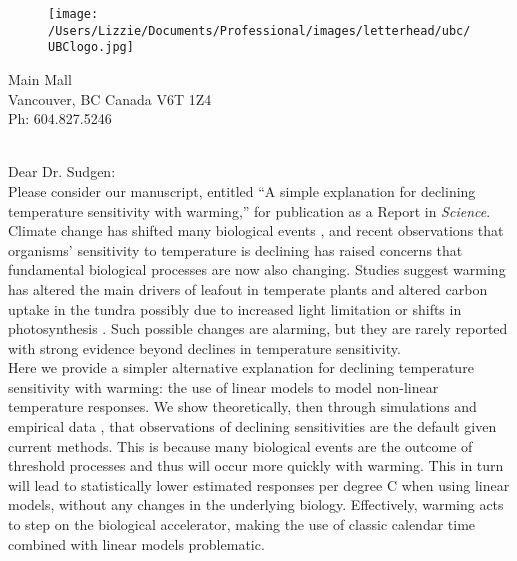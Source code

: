 \documentclass[11pt,a4paper]{article}
\begin{document}

\begin{figure}[htbp]
\hspace*{14cm}                                                           
\texttt{[image: /Users/Lizzie/Documents/Professional/images/letterhead/ubc/UBClogo.jpg]}
\end{figure}
\vspace{-10ex}
\begin{small}
 Main Mall \\
\noindent Vancouver, BC Canada V6T 1Z4\\
\noindent Ph: 604.827.5246\\
\end{small}
\vspace{2ex}\\
\noindent Dear Dr. Sudgen:
\vspace{1.5ex}\\
Please consider our manuscript, entitled ``A simple explanation for declining temperature sensitivity with warming,'' for publication as a Report in \emph{Science}. 
\vspace{1.5ex}\\
Climate change has shifted many biological events \citep{IPCC:2014sm}, and recent observations that organisms' sensitivity to temperature is declining has raised concerns that fundamental biological processes are now also changing. Studies suggest warming has altered the main drivers of leafout in temperate plants \citep{fu2015,gusewell2017,Samplonius:2018aa,vitasse2018} and altered carbon uptake in the tundra possibly due to increased light limitation or shifts in photosynthesis \citep{piao2017,Zhu2019}. Such possible changes are alarming, but they are rarely reported with strong evidence beyond declines in temperature sensitivity.
\vspace{1.5ex}\\
Here we provide a simpler alternative explanation for declining temperature sensitivity with warming: the use of linear models to model non-linear temperature responses. We show theoretically, then through simulations and empirical data \citep[using the same dataset used in][]{fu2015}, that observations of declining sensitivities are the default given current methods. This is because many biological events are the outcome of threshold processes and thus will occur more quickly with warming. This in turn will lead to statistically lower estimated responses per degree C when using linear models, without any changes in the underlying biology. Effectively, warming acts to step on the biological accelerator, making the use of classic calendar time combined with linear models problematic. 
\end{document}
